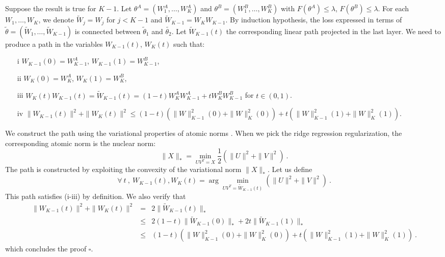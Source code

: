 Suppose the result is true for $K-1$. Let $\theta^A = (W_1^A, \dots, W^A_K)$ and 
 $\theta^B = (W_1^B, \dots, W^B_K)$ with $F(\theta^A) \leq \lambda$, $F(\theta^B) \leq \lambda$.
For each $W_1, \dots, W_K$, we denote $\tilde{W}_j = W_j$ for $j < K-1$ and
$\tilde{W}_{K-1} = W_K W_{K-1}$. By induction hypothesis, the 
loss expressed in terms of $\tilde{\theta} = (\tilde{W}_1, \dots, \tilde{W}_{K-1})$ is connected 
between $\tilde{\theta}_1$ and $\tilde{\theta_2}$. Let $\tilde{W}_{K-1}(t)$ the corresponding 
linear path projected in the last layer. 
We need to produce a path in the variables $W_{K-1}(t)$, $W_K(t)$ 
such that:
\begin{itemize}
\item[i] $W_{K-1}(0) = W_{K-1}^A$, $W_{K-1}(1) = W_{K-1}^B$, 
\item[ii] $W_{K}(0) = W_{K}^A$, $W_{K}(1) = W_{K}^B$,
\item[iii] $W_{K}(t) W_{K-1}(t) = \tilde{W}_{K-1}(t) = (1-t) W_{K}^A W_{K-1}^A + t W_{K}^B W_{K-1}^B $ for $t \in (0,1)$. 
\item[iv] $\| W_{K-1}(t) \|^2 + \| W_{K}(t) \|^2 \leq (1-t) ( \| W \|_{K-1}^2(0) + \| W \|_{K}^2(0)  ) + t (\| W \|_{K-1}^2(1) + \| W \|_{K}^2(1))$.
\end{itemize} 
We construct the path using the variational properties of atomic norms \cite{bachatomic}. 
When we pick the ridge regression regularization, the corresponding atomic norm is the 
nuclear norm:
$$\| X \|_{*} = \min_{UV^T = X} \frac{1}{2}( \| U \|^2 + \| V \|^2)~.$$
The path is constructed by exploiting the convexity of the variational norm $\| X\|_{*}$. 
Let us define 
$$\forall~t~,~W_{K-1}(t), W_{K}(t) = \arg\min_{UV^T= \tilde{W}_{K-1}(t)} (\| U\|^2 + \|V \|^2)~. $$ 
This path satisfies (i-iii) by definition. We also verify that 
\begin{eqnarray*}
\| W_{K-1}(t) \|^2 + \| W_{K}(t) \|^2 &=& 2 \| \tilde{W}_{K-1}(t)\|_{*}   \\
&\leq & 2 (1-t) \|  \tilde{W}_{K-1}(0)\|_{*} + 2 t  \|  \tilde{W}_{K-1}(1)\|_{*} \\ 
&\leq & (1-t) ( \| W \|_{K-1}^2(0) + \| W \|_{K}^2(0)  ) + t (\| W \|_{K-1}^2(1) + \| W \|_{K}^2(1))~.
\end{eqnarray*}
which concludes the proof $\square$. 




